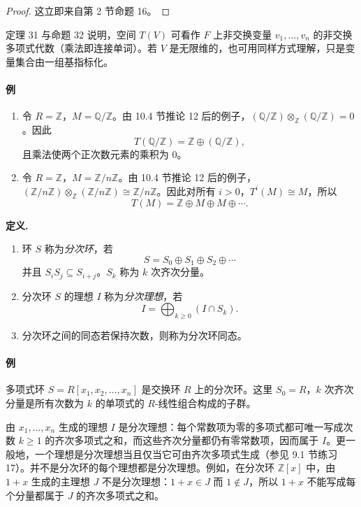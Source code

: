 \begin{proof}
这立即来自第 2 节命题 16。
\end{proof}

定理 31 与命题 32 说明，空间 $T(V)$ 可看作 $F$ 上非交换变量 $v_1,
\ldots,v_n$ 的非交换多项式代数（乘法即连接单词）。若 $V$ 是无限维的，也可用同样方式理解，只是变量集合由一组基指标化。

\paragraph{例}
\begin{enumerate}[label=(\arabic*)]
\item 令 $R=\mathbb Z$，$M=\mathbb Q/\mathbb Z$。由 10.4 节推论 12 后的例子，$(\mathbb Q/\mathbb Z)\otimes_{\mathbb Z}(\mathbb Q/\mathbb Z)=0$。因此
\[
T(\mathbb Q/\mathbb Z)=\mathbb Z\oplus(\mathbb Q/\mathbb Z),
\]
且乘法使两个正次数元素的乘积为 $0$。
\item 令 $R=\mathbb Z$，$M=\mathbb Z/n\mathbb Z$。由 10.4 节推论 12 后的例子，$(\mathbb Z/n\mathbb Z)\otimes_{\mathbb Z}(\mathbb Z/n\mathbb Z)\cong\mathbb Z/n\mathbb Z$。因此对所有 $i>0$，$T^i(M)\cong M$，所以
\[
T(M)=\mathbb Z\oplus M\oplus M\oplus\cdots.
\]
\end{enumerate}

\noindent\textbf{定义.}
\begin{enumerate}[label=(\arabic*)]
\item 环 $S$ 称为\emph{分次环}，若
\[
S=S_0\oplus S_1\oplus S_2\oplus\cdots
\]
并且 $S_iS_j\subseteq S_{i+j}$。$S_k$ 称为 $k$ 次齐次分量。
\item 分次环 $S$ 的理想 $I$ 称为\emph{分次理想}，若
\[
I=\bigoplus_{k\geq0}(I\cap S_k).
\]
\item 分次环之间的同态若保持次数，则称为分次环同态。
\end{enumerate}

\paragraph{例}
多项式环 $S=R[x_1,x_2,\ldots,x_n]$ 是交换环 $R$ 上的分次环。这里 $S_0=R$，$k$ 次齐次分量是所有次数为 $k$ 的单项式的 $R$-线性组合构成的子群。

由 $x_1,
\ldots,x_n$ 生成的理想 $I$ 是分次理想：每个常数项为零的多项式都可唯一写成次数 $k\geq1$ 的齐次多项式之和，而这些齐次分量都仍有零常数项，因而属于 $I$。更一般地，一个理想是分次理想当且仅当它可由齐次多项式生成（参见 9.1 节练习 17）。并不是分次环的每个理想都是分次理想。例如，在分次环 $\mathbb Z[x]$ 中，由 $1+x$ 生成的主理想 $J$ 不是分次理想：$1+x\in J$ 而 $1\notin J$，所以 $1+x$ 不能写成每个分量都属于 $J$ 的齐次多项式之和。

